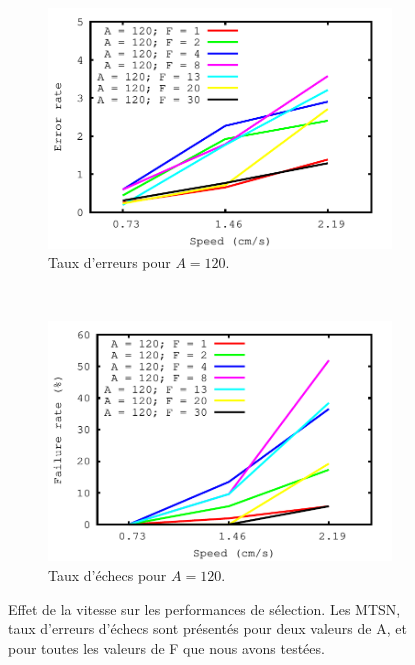 \begin{figure}[!htb]
\begin{subfigure}[t]{\subImgWlineplot}
			\includegraphics[width=\textwidth]{figures/ch4/speed_angle_120_errors}
			\caption{Taux d'erreurs pour $A = 120$.}
			\label{fig:spEffect_e_120}
		\end{subfigure}
		~
		\begin{subfigure}[t]{\subImgWlineplot}
			\centering
			\includegraphics[width=\textwidth]{figures/ch4/speed_angle_120_failures}
			\caption{Taux d'échecs pour $A = 120$.}
			\label{fig:spEffect_f_120}
		\end{subfigure}
		\caption[Effet de la vitesse sur les performances de sélection]{Effet de la vitesse sur les performances de sélection. Les MTSN, taux d'erreurs d'échecs sont présentés pour deux valeurs de A, et pour toutes les valeurs de F que nous avons testées.}
		\label{fig:spEffectPerf}
	\end{figure}


